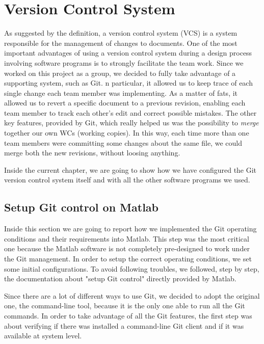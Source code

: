 
\chapter{Version Control System}
As suggested by the definition, a version control system (VCS) is a system responsible for the management of changes to documents. One of the most important advantages of using a version control system during a design process involving software programs is to strongly facilitate the team work. Since we worked on this project as a group, we decided to fully take advantage of a supporting system, such as Git. n particular, it allowed us to keep trace of each single change each team member was implementing. As a matter of fats, it allowed us to revert a specific document to a previous revision, enabling each team member to track each other's edit and correct possible mistakes. The other key features, provided by Git, which really helped us was the possibility to \textit{merge} together our own WCs (working copies). In this way, each time more than one team members were committing some changes about the same file, we could merge both the new revisions, without loosing anything. 

Inside the current chapter, we are going to show how we have configured the Git version control system itself and with all the other software programs we used.
\section{Setup Git control on Matlab}
Inside this section we are going to report how we implemented the Git operating conditions and their requirements into Matlab. This step was the most critical one because the Matlab software is not completely pre-designed to work under the Git management. In order to setup the correct operating conditions, we set some initial configurations. To avoid following troubles, we followed, step by step, the documentation about "setup Git control" directly provided by Matlab.

Since there are a lot of different ways to use Git, we decided to adopt the original one, the command-line tool, because it is the only one able to run all the Git commands. In order to take advantage of all the Git features, the first step was about verifying if there was installed a command-line Git client and if it was available at system level. 

